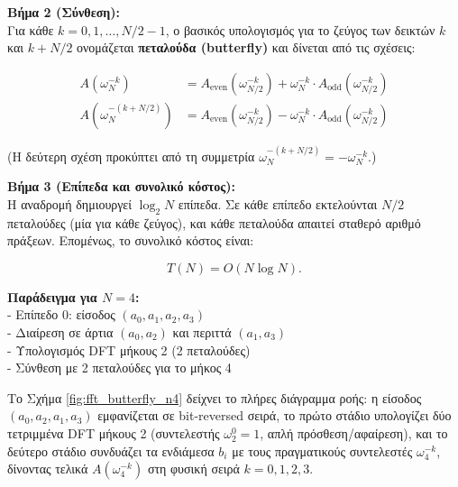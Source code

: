 \documentclass[a4paper, 11pt]{article}
\begin{document}
\textbf{Βήμα 2 (Σύνθεση):}\\
Για κάθε \(k = 0, 1, \dots, N/2 - 1\), ο βασικός υπολογισμός για το
ζεύγος των δεικτών \(k\) και \(k+N/2\) ονομάζεται \textbf{πεταλούδα
(butterfly)} και δίνεται από τις σχέσεις:

\[
\begin{aligned}
A(\omega_N^{-k}) &= A_{\text{even}}(\omega_{N/2}^{-k}) + \omega_N^{-k} \cdot A_{\text{odd}}(\omega_{N/2}^{-k}) \\
A(\omega_N^{-(k+N/2)}) &= A_{\text{even}}(\omega_{N/2}^{-k}) - \omega_N^{-k} \cdot A_{\text{odd}}(\omega_{N/2}^{-k})
\end{aligned}
\]

(Η δεύτερη σχέση προκύπτει από τη συμμετρία
\(\omega_N^{-(k+N/2)} = -\omega_N^{-k}\).)

\textbf{Βήμα 3 (Επίπεδα και συνολικό κόστος):}\\
Η αναδρομή δημιουργεί \(\log_2 N\) επίπεδα. Σε κάθε επίπεδο εκτελούνται
\(N/2\) πεταλούδες (μία για κάθε ζεύγος), και κάθε πεταλούδα απαιτεί
σταθερό αριθμό πράξεων. Επομένως, το συνολικό κόστος είναι:

\[
T(N) = O(N \log N).
\]

\textbf{Παράδειγμα για \(N=4\):}\\
- Επίπεδο 0: είσοδος \((a_0,a_1,a_2,a_3)\)\\
- Διαίρεση σε άρτια \((a_0,a_2)\) και περιττά \((a_1,a_3)\)\\
- Υπολογισμός DFT μήκους 2 (2 πεταλούδες)\\
- Σύνθεση με 2 πεταλούδες για το μήκος 4

Το Σχήμα \ref{fig:fft_butterfly_n4} δείχνει το πλήρες διάγραμμα ροής: η
είσοδος \((a_0,a_2,a_1,a_3)\) εμφανίζεται σε bit-reversed σειρά, το
πρώτο στάδιο υπολογίζει δύο τετριμμένα DFT μήκους 2 (συντελεστής
\(\omega_2^0=1\), απλή πρόσθεση/αφαίρεση), και το δεύτερο στάδιο
συνδυάζει τα ενδιάμεσα \(b_i\) με τους πραγματικούς συντελεστές
\(\omega_4^{-k}\), δίνοντας τελικά \(A(\omega_4^{-k})\) στη φυσική σειρά
\(k=0,1,2,3\).
\end{document}
